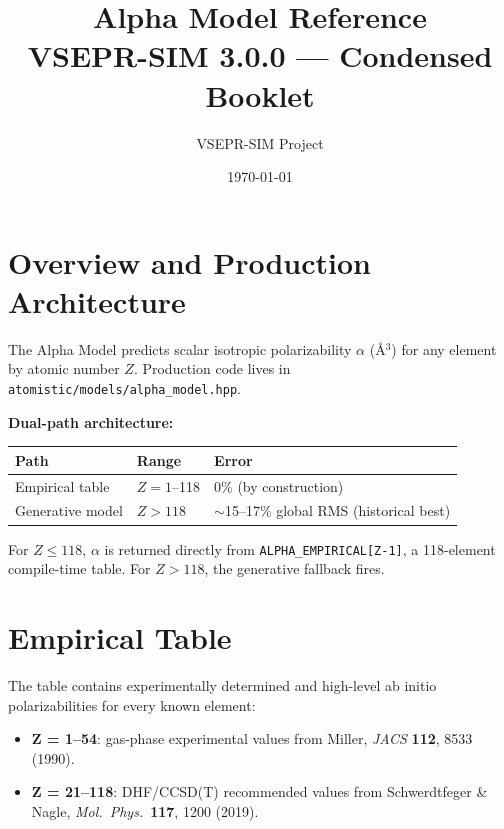 \documentclass[11pt,a4paper]{article}
\title{Alpha Model Reference\\{\large VSEPR-SIM 3.0.0 --- Condensed Booklet}}
\author{VSEPR-SIM Project}
\date{\today}
\begin{document}
\maketitle

\section{Overview and Production Architecture}

The Alpha Model predicts scalar isotropic polarizability
$\alpha$ (\AA${}^3$) for any element by atomic number $Z$.
Production code lives in
\texttt{atomistic/models/alpha\_model.hpp}.

\medskip
\noindent\textbf{Dual-path architecture:}

\begin{center}
\begin{tabular}{lll}
\toprule
\textbf{Path} & \textbf{Range} & \textbf{Error} \\
\midrule
Empirical table  & $Z=1$--118 & 0\% (by construction) \\
Generative model & $Z>118$    & \(\sim\)15--17\% global RMS (historical best) \\
\bottomrule
\end{tabular}
\end{center}

For $Z \le 118$, $\alpha$ is returned directly from
\texttt{ALPHA\_EMPIRICAL[Z-1]}, a 118-element compile-time table.
For $Z > 118$, the generative fallback fires.

\section{Empirical Table}

The table contains experimentally determined and high-level ab initio
polarizabilities for every known element:

\begin{itemize}
  \item \textbf{Z = 1--54}: gas-phase experimental values from
        Miller, \textit{JACS} \textbf{112}, 8533 (1990).
  \item \textbf{Z = 21--118}: DHF/CCSD(T) recommended values from
        Schwerdtfeger \& Nagle, \textit{Mol.\ Phys.}\ \textbf{117}, 1200 (2019).
\end{itemize}
\end{document}
